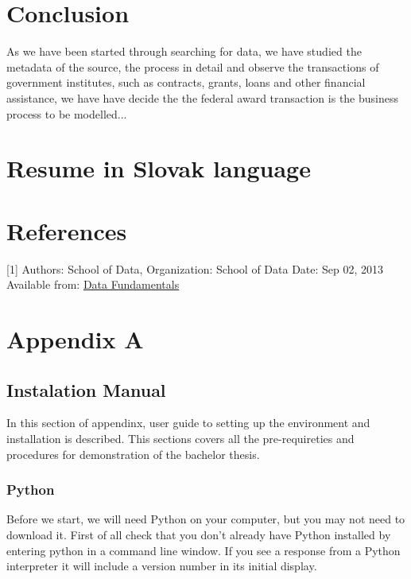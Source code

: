 \documentclass[letterpaper,12pt,oneside]{sphinxmanual}
\begin{document}
\chapter{Conclusion}
\label{conclusion::doc}\label{conclusion:conclusion}
As we have been started through searching for data, we have studied the metadata of the source,
the process in detail and observe the transactions of government institutes, such as contracts,
grants, loans and other financial assistance, we have have decide the the federal award transaction
is the business process to be modelled...


\chapter{Resume in Slovak language}
\label{resume::doc}\label{resume:resume-in-slovak-language}

\chapter{References}
\label{references::doc}\label{references:references}
\label{references:id1}{[}1{]} Authors: School of Data, Organization: School of Data Date: Sep 02, 2013 Available from: \href{http://schoolofdata.org/handbook/courses/what-is-data/}{Data Fundamentals}


\chapter{Appendix A}
\label{apendixa:appendix-a}\label{apendixa::doc}

\section{Instalation Manual}
\label{apendixa:instalation-manual}
In this section of appendinx, user guide to setting up the environment and installation is described.
This sections covers all the pre-requireties and procedures for demonstration of the bachelor thesis.


\subsection{Python}
\label{apendixa:python}
Before we start, we will need Python on your computer, but you may not need to download it.
First of all check that you don't already have Python installed by entering python in a command line window.
If you see a response from a Python interpreter it will include a version number in its initial display.
\end{document}
